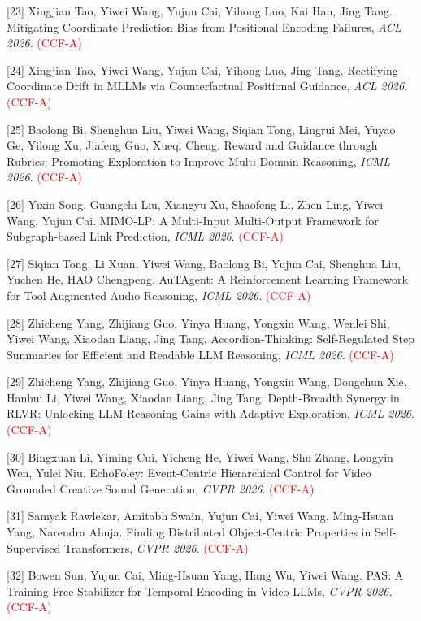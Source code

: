 [23] Xingjian Tao, Yiwei Wang, Yujun Cai, Yihong Luo, Kai Han, Jing Tang. Mitigating Coordinate Prediction Bias from Positional Encoding Failures, \textit{ACL 2026}. \textcolor{red}{(CCF-A)}

[24] Xingjian Tao, Yiwei Wang, Yujun Cai, Yihong Luo, Jing Tang. Rectifying Coordinate Drift in MLLMs via Counterfactual Positional Guidance, \textit{ACL 2026}. \textcolor{red}{(CCF-A)}

[25] Baolong Bi, Shenghua Liu, Yiwei Wang, Siqian Tong, Lingrui Mei, Yuyao Ge, Yilong Xu, Jiafeng Guo, Xueqi Cheng. Reward and Guidance through Rubrics: Promoting Exploration to Improve Multi-Domain Reasoning, \textit{ICML 2026}. \textcolor{red}{(CCF-A)}

[26] Yixin Song, Guangchi Liu, Xiangyu Xu, Shaofeng Li, Zhen Ling, Yiwei Wang, Yujun Cai. MIMO-LP: A Multi-Input Multi-Output Framework for Subgraph-based Link Prediction, \textit{ICML 2026}. \textcolor{red}{(CCF-A)}

[27] Siqian Tong, Li Xuan, Yiwei Wang, Baolong Bi, Yujun Cai, Shenghua Liu, Yuchen He, HAO Chengpeng. AuTAgent: A Reinforcement Learning Framework for Tool-Augmented Audio Reasoning, \textit{ICML 2026}. \textcolor{red}{(CCF-A)}

[28] Zhicheng Yang, Zhijiang Guo, Yinya Huang, Yongxin Wang, Wenlei Shi, Yiwei Wang, Xiaodan Liang, Jing Tang. Accordion-Thinking: Self-Regulated Step Summaries for Efficient and Readable LLM Reasoning, \textit{ICML 2026}. \textcolor{red}{(CCF-A)}

[29] Zhicheng Yang, Zhijiang Guo, Yinya Huang, Yongxin Wang, Dongchun Xie, Hanhui Li, Yiwei Wang, Xiaodan Liang, Jing Tang. Depth-Breadth Synergy in RLVR: Unlocking LLM Reasoning Gains with Adaptive Exploration, \textit{ICML 2026}. \textcolor{red}{(CCF-A)}

[30] Bingxuan Li, Yiming Cui, Yicheng He, Yiwei Wang, Shu Zhang, Longyin Wen, Yulei Niu. EchoFoley: Event-Centric Hierarchical Control for Video Grounded Creative Sound Generation, \textit{CVPR 2026}. \textcolor{red}{(CCF-A)}

[31] Samyak Rawlekar, Amitabh Swain, Yujun Cai, Yiwei Wang, Ming-Hsuan Yang, Narendra Ahuja. Finding Distributed Object-Centric Properties in Self-Supervised Transformers, \textit{CVPR 2026}. \textcolor{red}{(CCF-A)}

[32] Bowen Sun, Yujun Cai, Ming-Hsuan Yang, Hang Wu, Yiwei Wang. PAS: A Training-Free Stabilizer for Temporal Encoding in Video LLMs, \textit{CVPR 2026}. \textcolor{red}{(CCF-A)}

